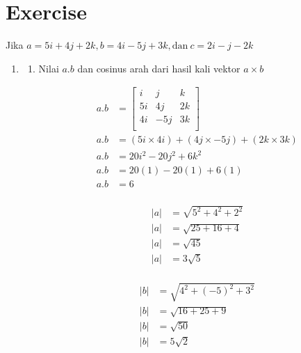 \documentclass[12pt,titlepage]{article}
\begin{document}
\section{Exercise}
Jika $a = 5i + 4j + 2k, b = 4i - 5j + 3k, \text{dan}~c = 2i - j - 2k$
\begin{enumerate}
    \item {
        \begin{enumerate}
            \item {
                Nilai $a.b$ dan cosinus arah dari hasil kali vektor $a \times b$
    
                \begin{align*}
                    a.b &= \left[\begin{matrix}
                        i  &  j &  k \\
                        5i & 4j & 2k \\
                        4i & -5j & 3k \\
                    \end{matrix}\right]\\
                    a.b &= (5i \times 4i) + (4j \times -5j) + (2k \times 3k) \\
                    a.b &= 20i^2 - 20j^2 + 6k^2 \\
                    a.b &= 20(1) - 20(1) + 6(1) \\
                    a.b &= 6 \\
                \end{align*}
    
                \begin{align*}
                    |a| &= \sqrt{5^2 + 4^2 + 2^2} \\
                    |a| &= \sqrt{25 + 16 + 4} \\
                    |a| &= \sqrt{45} \\
                    |a| &= 3\sqrt{5} \\
                \end{align*}
    
                \begin{align*}
                    |b| &= \sqrt{4^2 + (-5)^2 + 3^2} \\
                    |b| &= \sqrt{16 + 25 + 9} \\
                    |b| &= \sqrt{50} \\
                    |b| &= 5\sqrt{2} \\
                \end{align*}
    
}
\end{enumerate}}
\end{enumerate}
\end{document}
